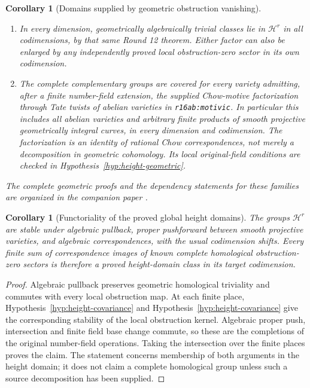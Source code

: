 \documentclass[11pt,a4paper]{article}
\newtheorem{corollary}[theorem]{Corollary}
\theoremstyle{definition}
\theoremstyle{remark}
\numberwithin{equation}{section}
\begin{document}
\begin{corollary}[Domains supplied by geometric obstruction vanishing]
\begin{enumerate}
      self-pairing
      $\operatorname{CH}^3_{\mathbf Q,\rm hom}\times
       \operatorname{CH}^3_{\mathbf Q,\rm hom}\to\mathbf R$.
      More generally, the same full conclusion holds for targets
      of the rational domination of dimension-at-most-five sources
      satisfying the original-field full-kernel hypothesis of
      \texttt{r16cov:rational-low-dimension}. In higher dimensions,
      one applies \texttt{r16cov:rational-outer} separately to
      both complementary codimensions; a theorem for one factor
      alone does not supply the other factor.
\item In every dimension, geometrically algebraically trivial classes
      lie in $\mathcal H^r$ in all codimensions, by that same Round 12
      theorem. Either factor can also be enlarged by any independently
      proved local obstruction-zero sector in its own codimension.
\item The complete complementary groups are covered for every
      variety admitting, after a finite number-field extension, the
      supplied Chow-motive factorization through Tate twists of
      abelian varieties in \texttt{r16ab:motivic}. In particular this
      includes all abelian varieties and arbitrary finite products
      of smooth projective geometrically integral curves, in every
      dimension and codimension. The factorization is an identity
      of rational Chow correspondences, not merely a decomposition
      in geometric cohomology. Its local original-field conditions
      are checked in Hypothesis~\ref{hyp:height-geometric}.
\end{enumerate}
The complete geometric proofs and the dependency statements for these families are organized in the companion paper \cite{SC}.
\end{corollary}

\begin{corollary}[Functoriality of the proved global height domains]
\label{r16h:domain-functoriality}
The groups $\mathcal H^r$ are stable under algebraic pullback,
proper pushforward between smooth projective varieties, and
algebraic correspondences, with the usual codimension shifts.
Every finite sum of correspondence images of known complete
homological obstruction-zero sectors is therefore a proved
height-domain class in its target codimension.
\end{corollary}

\begin{proof}
Algebraic pullback preserves geometric homological triviality and
commutes with every local obstruction map. At each finite place,
Hypothesis~\ref{hyp:height-covariance} and
Hypothesis~\ref{hyp:height-covariance} give the corresponding stability
of the local obstruction kernel. Algebraic proper push,
intersection and finite field base change commute, so these are
the completions of the original number-field operations.
Taking the intersection over the finite places proves the claim.
The statement concerns membership of both arguments in the
height domain; it does not claim a complete homological group
unless such a source decomposition has been supplied.
\end{proof}
\end{document}
